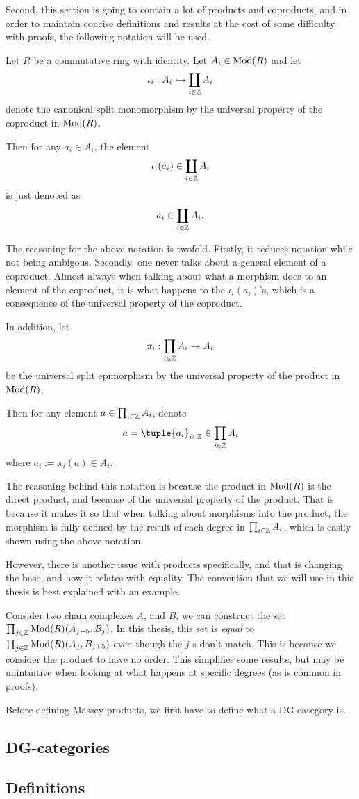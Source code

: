 Second, this section is going to contain a lot of products and coproducts, and in order to maintain concise definitions and results at the cost of some difficulty with proofs, the following notation will be used.
\begin{notation}
    \label{not:coprod_prod_forvirring}
    Let \( R \) be a commutative ring with identity. Let \( A_i \in \operatorname{Mod}(R) \) and let
    \[
        \iota_i: A_i \rightarrowtail \coprod_{i \in {\mathbb{Z}}} A_i
    \]
    denote the canonical split monomorphism by the universal property of the coproduct in \( \operatorname{Mod}(R) \).

    Then for any \( a_i \in A_i \), the element
    \[
        \iota_i(a_i) \in \coprod_{i \in {\mathbb{Z}}} A_i
    \]
    is just denoted as
    \[
        a_i \in \coprod_{i \in {\mathbb{Z}}} A_i.
    \]
    
    The reasoning for the above notation is twofold. Firstly, it reduces notation while not being ambigous. Secondly, one never talks about a general element of a coproduct. Almost always when talking about what a morphism does to an element of the coproduct, it is what happens to the \( \iota_i(a_i) \)'s, which is a consequence of the universal property of the coproduct.

    In addition, let 
    \[
        \pi_i: \prod_{i \in {\mathbb{Z}}} A_i \twoheadrightarrow A_i
    \]
    be the universal split epimorphism by the universal property of the product in \( \operatorname{Mod}(R) \).
    
    Then for any element \( a \in \prod_{i \in {\mathbb{Z}}} A_i \), denote
    \[
        a = \tuple{a_i}_{i \in \Zb} \in \prod_{i \in \Zb} A_i
    \]
    where \( a_i := \pi_i(a) \in A_i \).
    
    The reasoning behind this notation is because the product in \( \operatorname{Mod}(R) \) is the direct product, and because of the universal property of the product. That is because it makes it so that when talking about morphisms into the product, the morphism is fully defined by the result of each degree in \( \prod_{i \in {\mathbb{Z}}} A_i \), which is easily shown using the above notation.

    However, there is another issue with products specifically, and that is changing the base, and how it relates with equality. The convention that we will use in this thesis is best explained with an example.
    
    Consider two chain complexes \( A \), and \( B \), we can construct the set \( \prod_{j \in {\mathbb{Z}}} \operatorname{Mod}(R)(A_{j - 5}, B_j) \). In this thesis, this set is \emph{equal} to \( \prod_{j \in {\mathbb{Z}}} \operatorname{Mod}(R)(A_j, B_{j + 5}) \) even though the \( j \)-s don't match. This is because we consider the product to have no order. This simplifies some results, but may be unintuitive when looking at what happens at specific degrees (as is common in proofs).
\end{notation}

Before defining Massey products, we first have to define what a DG-category is.

\subsection{DG-categories}


\subsection{Definitions}

